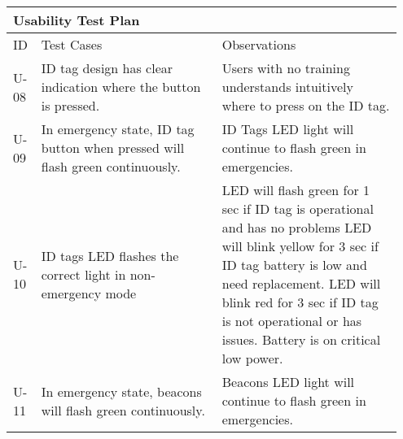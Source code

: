 \begin{table}[h!]
    \centering
    \begin{tabular}{|m{0.05\linewidth}|m{0.45\linewidth}|m{0.45\linewidth}|} 
    \hline
    \multicolumn{3}{|l|}{\textbf{Usability Test Plan}}           \\ 
    \hline
    ID    & Test Cases    & Observations     \\ 
    \hline
    
    
    U-08
    & ID tag design has clear indication where the button is pressed.
    & Users with no training understands intuitively where to press on the ID tag.  \\ 
    \hline

    U-09
    & In emergency state, ID tag button when pressed will flash green continuously.
    & ID Tags LED light will continue to flash green in emergencies.  \\ 
    \hline
    
    U-10
    & ID tags LED flashes the correct light in non-emergency mode
    & LED will flash green for 1 sec if ID tag is operational and has no problems
      LED will blink yellow for 3 sec if ID tag battery is low and need replacement.
      LED will blink red for 3 sec if ID tag is not operational or has issues. Battery is on critical low power.  \\
    \hline

    U-11
    & In emergency state, beacons will flash green continuously.
    & Beacons LED light will continue to flash green in emergencies.  \\ 
    \hline


\end{tabular}
\end{table}
